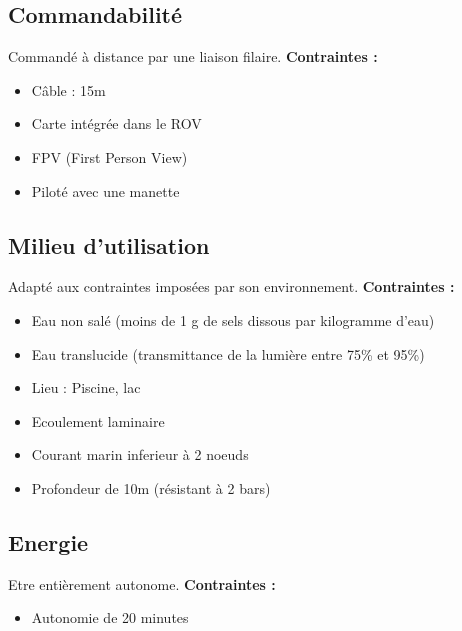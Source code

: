 \documentclass[a4paper,11pt]{report}
\begin{document}
						\subsection{Commandabilité}
								Commandé à distance par une liaison filaire.\newline
								\textbf{Contraintes :}
								\begin{itemize}
										\item Câble : 15m
										\item Carte intégrée dans le ROV
										\item FPV (First Person View)
										\item Piloté avec une manette \newline \newline
								\end{itemize}

						\subsection{Milieu d'utilisation}
								Adapté aux contraintes imposées par son environnement. \newline
								\textbf{Contraintes :}
								\begin{itemize}
										\item Eau non salé (moins de 1 g de sels dissous par kilogramme d'eau)
										\item Eau translucide (transmittance de la lumière entre 75\% et 95\%)
										\item Lieu : Piscine, lac
										\item Ecoulement laminaire
										\item Courant marin inferieur à 2 noeuds
										\item Profondeur de 10m (résistant à 2 bars) \newline \newline
								\end{itemize}

						\subsection{Energie}
								Etre entièrement autonome. \newline
								\textbf{Contraintes :}
								\begin{itemize}
										\item Autonomie de 20 minutes
								\end{itemize}
\end{document}
